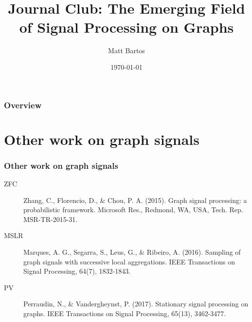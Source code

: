 \documentclass{beamer}
\title[Signal Processing on Graphs]{Journal Club: The Emerging Field of Signal Processing on Graphs} %
\author{Matt Bartos} %
\institute[UM] %
{
University of Michigan \\ %
\medskip
\textit{mdbartos@umich.edu} %
}
\date{\today} %
\begin{document}
\begin{frame}
\titlepage %
\end{frame}

\begin{frame}
\frametitle{Overview} %
\tableofcontents %
\end{frame}


\section{Other work on graph signals} %

\begin{frame}
\frametitle{Other work on graph signals}

\begin{description}
\item[ZFC] Zhang, C., Florencio, D., \& Chou, P. A. (2015). Graph signal processing: a
  probabilistic framework. Microsoft Res., Redmond, WA, USA, Tech. Rep.
  MSR-TR-2015-31.

\item[MSLR] Marques, A. G., Segarra, S., Leus, G., \& Ribeiro, A. (2016). Sampling of
  graph signals with successive local aggregations. IEEE Transactions on Signal
  Processing, 64(7), 1832-1843.

\item[PV] Perraudin, N., \& Vandergheynst, P. (2017). Stationary signal processing on
  graphs. IEEE Transactions on Signal Processing, 65(13), 3462-3477.
\end{description}
\end{frame}
\end{document}
